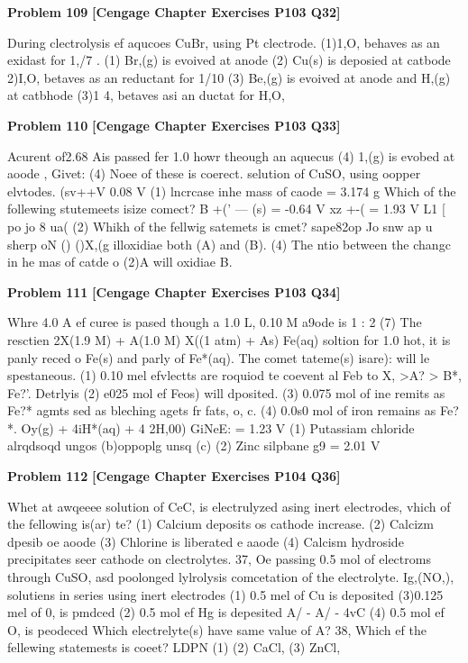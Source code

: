 \begin{problembox}
\textbf{Problem 109} \hfill \textbf{[Cengage Chapter Exercises P103 Q32]}
\label{q:ext-cng-th-109}

During clectrolysis ef aqucoes CuBr, using Pt clectrode.
(1)1,O, behaves as an exidast for 1,/7 .
(1) Br,(g) is evoived at anode
(2) Cu(s) is deposied at catbode
2)I,O, betaves as an reductant for 1/10
(3) Be,(g) is evoived at anode and H,(g) at catbhode
(3)1 4, betaves asi an ductat for H,O,
\end{problembox}

\begin{problembox}
\textbf{Problem 110} \hfill \textbf{[Cengage Chapter Exercises P103 Q33]}
\label{q:ext-cng-th-110}

Acurent of2.68 Ais passed fer 1.0 howr theough an aquecus
(4) 1,(g) is evobed at aoode
, Givet:
(4) Noee of these is coerect.
selution of CuSO, using oopper elvtodes.
(sv++V
   0.08 V
(1) lncrcase inhe mass of caode = 3.174 g
Which of the follewing stutemeets isize comect?
B  +(' --- (s)
 = -0.64 V
xz +-( 
  = 1.93 V
L1 [  po jo   8 ua( (2)
Whikh of the fellwig satemets is  cmet?
sape82op Jo snw ap u sherp oN ()
()X,(g illoxidiae both (A) and (B).
(4) The ntio between the changc in he mas of catde o
(2)A will oxidiae B.
\end{problembox}

\begin{problembox}
\textbf{Problem 111} \hfill \textbf{[Cengage Chapter Exercises P103 Q34]}
\label{q:ext-cng-th-111}

Whre 4.0 A ef curee is pased though a 1.0 L, 0.10 M
a9ode is 1 : 2
(7) The resctien
2X(1.9 M) + A(1.0 M) X((1 atm) + As)
Fe(aq) soltion for 1.0 hot, it is panly reced o Fe(s)
and parly of Fe*(aq). The comet tateme(s) isare):
will le spestaneous.
(1) 0.10 mel efvlectts are roquiod te coevent al Feb to
X, >A? > B*,
Fe?'.
Detrlyis
(2) e025 mol ef Feos) will  dposited.
(3) 0.075 mol of ine remits as Fe?*
agmts sed as bleching agets fr fats, o, c.
(4) 0.0s0 mol of iron remains as Fe?*.
Oy(g) + 4iH*(aq) + 4   2H,00)
GiNeE:
  = 1.23 V
(1) Putassiam chloride
alrqdsoqd ungos (b)oppoplg unsq (c)
(2) Zinc silpbane
g9 = 2.01 V
\end{problembox}

\begin{problembox}
\textbf{Problem 112} \hfill \textbf{[Cengage Chapter Exercises P104 Q36]}
\label{q:ext-cng-th-112}

Whet at awqeeee solution of CeC, is electrulyzed asing
inert electrodes, vhich of the fellowing is(ar) te?
(1) Calcium deposits os cathode
increase.
(2) Calcizm dpesib oe aoode
(3) Chlorine is liberated e aaode
(4) Calcism hydroside precipitates seer cathode on
clectrolytes.
37, Oe passing 0.5 mol of electroms through CuSO, asd
poolonged lylrolysis
comcetation of the electrolyte.
Ig,(NO,), solutiens in series using inert electrodes
(1) 0.5 mel of Cu is deposited
(3)0.125 mel of 0, is pmdced
(2) 0.5 mol ef Hg is depesited
A/ - A/  - 4vC
(4) 0.5 mol ef O, is peodeced
Which electrelyte(s) have same value of A?
38, Which ef the fellewing statemests is  coeet?
LDPN (1)
(2) CaCl,
(3) ZnCl,
\end{problembox}


